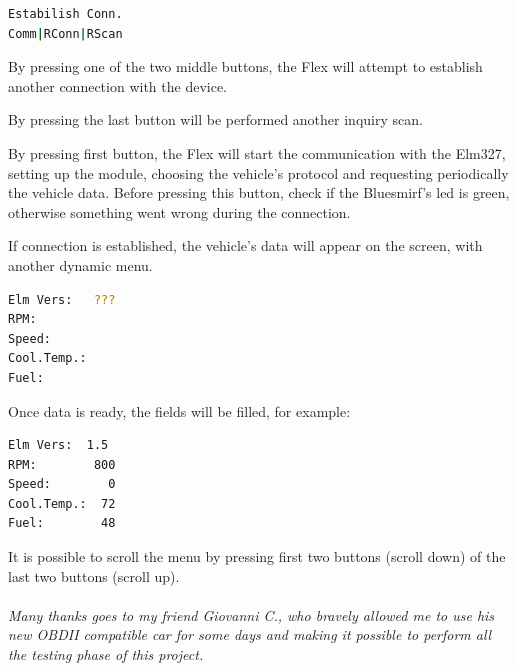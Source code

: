 \documentclass[twoside]{article}
\begin{document}
\begin{multicols}{2}
\begin{lstlisting}[language=bash]
Estabilish Conn.
Comm|RConn|RScan
\end{lstlisting}

By pressing one of the two middle buttons, the Flex will attempt to establish another connection with the device.

By pressing the last button will be performed another inquiry scan.

By pressing first button, the Flex will start the communication with the Elm327, setting up the module, choosing the vehicle's protocol and requesting periodically the vehicle data. Before pressing this button, check if the Bluesmirf's led is green, otherwise something went wrong during the connection.

If connection is established, the vehicle's data will appear on the screen, with another dynamic menu.

\begin{lstlisting}[language=bash]
Elm Vers:   ???
RPM:
Speed:
Cool.Temp.:
Fuel:
\end{lstlisting}

Once data is ready, the fields will be filled, for example:

\begin{lstlisting}[language=bash]
Elm Vers:  1.5
RPM:        800
Speed:        0
Cool.Temp.:  72
Fuel:        48
\end{lstlisting}

It is possible to scroll the menu by pressing first two buttons (scroll down) of the last two buttons (scroll up).
\\
\\
\emph{
Many thanks goes to my friend Giovanni C., who bravely allowed me to use his new OBDII compatible car for some days and making it possible to perform all the testing phase of this project.
}



\end{multicols}
\end{document}
